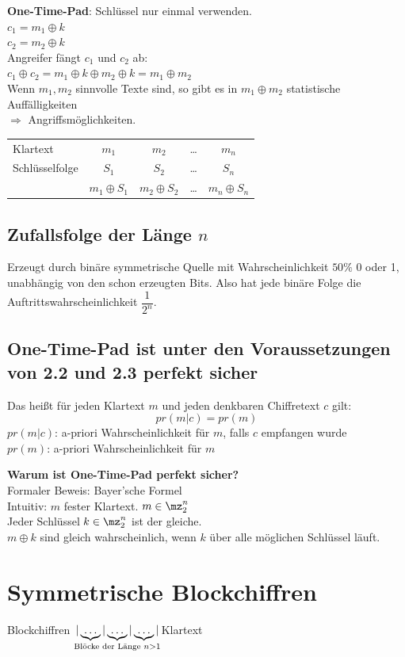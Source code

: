 		\textbf{One-Time-Pad}: Schlüssel nur einmal verwenden.\\
		$c_1=m_1\oplus k$\\
		$c_2=m_2\oplus k$\\
		Angreifer fängt $c_1$ und $c_2$ ab:\\
		$c_1\oplus c_2 = m_1\oplus k\oplus m_2\oplus k=m_1\oplus m_2$\\
		Wenn $m_1,m_2$ sinnvolle Texte sind, so gibt es in $m_1\oplus m_2$ statistische Auffälligkeiten \\
		$\Rightarrow$ Angriffsmöglichkeiten.
		
		\begin{tabular}{lcccc}
		Klartext&$m_1$&$m_2$&\dots &$m_n$\\
		Schlüsselfolge&$S_1$&$S_2$&\dots &$S_n$\\
		&$m_1\oplus S_1$&$m_2\oplus S_2$&\dots &$m_n\oplus S_n$
		\end{tabular}
		
	\subsection{Zufallsfolge der Länge \texorpdfstring{$n$}{n}}
		Erzeugt durch binäre symmetrische Quelle mit Wahrscheinlichkeit $50\%$ 0 oder 1, unabhängig von den schon erzeugten Bits. Also hat jede binäre Folge die Auftrittswahrscheinlichkeit $\dfrac{1}{2^n}$.
		
	\subsection{One-Time-Pad ist unter den Voraussetzungen von 2.2 und 2.3 perfekt sicher}
		Das heißt für jeden Klartext $m$ und jeden denkbaren Chiffretext $c$ gilt:
		\[pr(m|c)=pr(m)\]
		$pr(m|c)$: a-priori Wahrscheinlichkeit für $m$, falls $c$ empfangen wurde\\
		$pr(m)$: a-priori Wahrscheinlichkeit für $m$
		
		\textbf{Warum ist One-Time-Pad perfekt sicher?}\\
		Formaler Beweis: Bayer'sche Formel\\
		Intuitiv: $m$ fester Klartext. $m\in\mz_2^n$\\
		Jeder Schlüssel $k\in\mz_2^n$ ist der gleiche.\\
		$m\oplus k$ sind gleich wahrscheinlich, wenn $k$ über alle möglichen Schlüssel läuft.

\section{Symmetrische Blockchiffren}
	Blockchiffren $\underset{\mbox{\scriptsize Blöcke der Länge }n>1}{|\underbrace{\dots}|\underbrace{\dots}|\underbrace{\dots}|}$\quad Klartext
	
